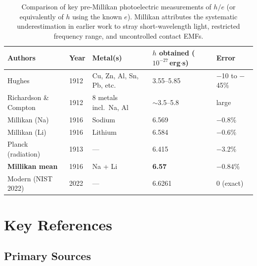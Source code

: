 \documentclass[12pt]{article}
\begin{document}
\begin{table}[ht]
\centering
\caption{Comparison of key pre-Millikan photoelectric measurements of
$h/e$ (or equivalently of $h$ using the known $e$).  Millikan attributes
the systematic underestimation in earlier work to stray short-wavelength
light, restricted frequency range, and uncontrolled contact EMFs.}
\label{tab:comparison}
\begin{tabular}{lllll}
\toprule
Authors & Year & Metal(s) & 
  $h$ obtained ($10^{-27}$\,erg$\cdot$s) & Error \\
\midrule
Hughes               & 1912 & Cu, Zn, Al, Sn, Pb, etc. & 3.55--5.85 & $-$10 to $-$45\% \\
Richardson \& Compton& 1912 & 8 metals incl.\ Na, Al    & $\sim$3.5--5.8 & large \\
Millikan (Na)        & 1916 & Sodium       & 6.569 & $-$0.8\% \\
Millikan (Li)        & 1916 & Lithium      & 6.584 & $-$0.6\% \\
Planck (radiation)   & 1913 & ---          & 6.415 & $-$3.2\% \\
\textbf{Millikan mean} & 1916 & Na + Li    & \textbf{6.57} & $\mathbf{-0.84\%}$ \\
Modern (NIST 2022)   & 2022 & ---          & 6.6261 & 0 (exact) \\
\bottomrule
\end{tabular}
\end{table}

\section{Key References}

\subsection*{Primary Sources}
\end{document}
